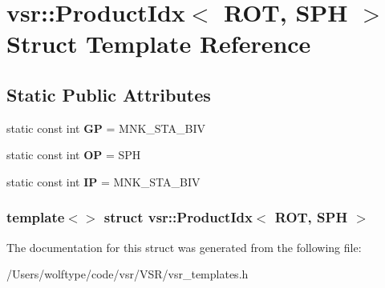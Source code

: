 \hypertarget{structvsr_1_1_product_idx_3_01_r_o_t_00_01_s_p_h_01_4}{\section{vsr\-:\-:Product\-Idx$<$ R\-O\-T, S\-P\-H $>$ Struct Template Reference}
\label{structvsr_1_1_product_idx_3_01_r_o_t_00_01_s_p_h_01_4}
}
\subsection*{Static Public Attributes}
\begin{DoxyCompactItemize}
\item 
\hypertarget{structvsr_1_1_product_idx_3_01_r_o_t_00_01_s_p_h_01_4_a696d605878fa33b7ed1889c3805fa634}{static const int {\bfseries G\-P} = M\-N\-K\-\_\-\-S\-T\-A\-\_\-\-B\-I\-V}\label{structvsr_1_1_product_idx_3_01_r_o_t_00_01_s_p_h_01_4_a696d605878fa33b7ed1889c3805fa634}

\item 
\hypertarget{structvsr_1_1_product_idx_3_01_r_o_t_00_01_s_p_h_01_4_a7a1c6271d70840979275610b25a6cb5f}{static const int {\bfseries O\-P} = S\-P\-H}\label{structvsr_1_1_product_idx_3_01_r_o_t_00_01_s_p_h_01_4_a7a1c6271d70840979275610b25a6cb5f}

\item 
\hypertarget{structvsr_1_1_product_idx_3_01_r_o_t_00_01_s_p_h_01_4_adc544d8dd0169dfddbcd500f334c82fc}{static const int {\bfseries I\-P} = M\-N\-K\-\_\-\-S\-T\-A\-\_\-\-B\-I\-V}\label{structvsr_1_1_product_idx_3_01_r_o_t_00_01_s_p_h_01_4_adc544d8dd0169dfddbcd500f334c82fc}

\end{DoxyCompactItemize}
\subsubsection*{template$<$$>$ struct vsr\-::\-Product\-Idx$<$ R\-O\-T, S\-P\-H $>$}



The documentation for this struct was generated from the following file\-:\begin{DoxyCompactItemize}
\item 
/\-Users/wolftype/code/vsr/\-V\-S\-R/vsr\-\_\-templates.\-h\end{DoxyCompactItemize}
